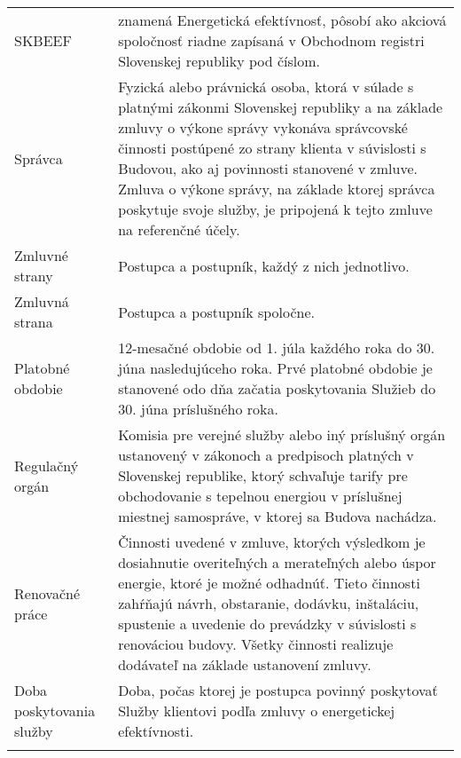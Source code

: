 \documentclass[a4paper]{article}
\begin{document}
\begin{longtabu}{|X|X[2]|}
   \hline

   SKBEEF & znamená Energetická efektívnosť, pôsobí ako akciová spoločnosť riadne zapísaná v Obchodnom registri Slovenskej republiky pod číslom.\\\tabucline{}

   \hline

   Správca & Fyzická alebo právnická osoba, ktorá v súlade s platnými zákonmi Slovenskej republiky a na základe zmluvy o výkone správy vykonáva správcovské činnosti postúpené zo strany klienta v súvislosti s Budovou, ako aj povinnosti stanovené v zmluve. Zmluva o výkone správy, na základe ktorej správca poskytuje svoje služby, je pripojená k tejto zmluve na referenčné účely.\\\tabucline{}

   \hline

   Zmluvné strany & Postupca a postupník, každý z nich jednotlivo.\\\tabucline{}

   \hline

   Zmluvná strana & Postupca a postupník spoločne.\\\tabucline{}

   \hline

   Platobné obdobie &  12-mesačné obdobie od 1. júla každého roka do 30. júna nasledujúceho roka. Prvé platobné obdobie je stanovené odo dňa začatia poskytovania Služieb do 30. júna príslušného roka. \\\tabucline{}

   \hline

   Regulačný orgán & Komisia pre verejné služby alebo iný príslušný orgán ustanovený v zákonoch a predpisoch platných v Slovenskej republike, ktorý schvaľuje tarify pre obchodovanie s tepelnou energiou v príslušnej miestnej samospráve, v ktorej sa Budova nachádza.\\\tabucline{}

   \hline

   Renovačné práce & Činnosti uvedené v zmluve, ktorých výsledkom je dosiahnutie overiteľných a merateľných alebo úspor energie, ktoré je možné odhadnúť. Tieto činnosti zahŕňajú návrh, obstaranie, dodávku, inštaláciu, spustenie a uvedenie do prevádzky v súvislosti s renováciou budovy. Všetky činnosti realizuje dodávateľ na základe ustanovení zmluvy.\\\tabucline{}

   \hline

   Doba poskytovania služby& Doba, počas ktorej je postupca povinný poskytovať Služby klientovi podľa zmluvy o energetickej efektívnosti.\\\tabucline{}


\end{longtabu}
\end{document}
